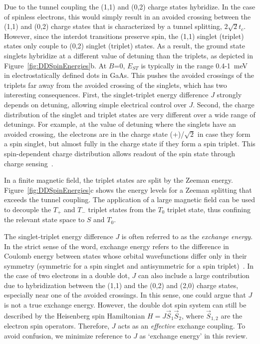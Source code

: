 \documentclass[rmp,twocolumn,aps]{revtex4}
\begin{document}
Due to the tunnel coupling the (1,1) and (0,2) charge states
hybridize. In the case of spinless electrons, this would simply
result in an avoided crossing between the (1,1) and (0,2) charge
states that is characterized by a tunnel splitting, $2\sqrt{2}
t_c$. However, since the interdot transitions preserve spin, the
(1,1) singlet (triplet) states only couple to (0,2)
singlet (triplet) states. As a result, the ground state singlets
hybridize at a different value of detuning than the triplets, as depicted
in Figure~\ref{fig:DDSpinEnergies}b. At $B$=0, $E_{ST}$ is typically in the range 0.4-1~meV in electrostatically defined dots in GaAs.
This pushes the avoided crossings of the triplets far away from
the avoided crossing of the singlets, which has two interesting consequences.
First, the singlet-triplet energy difference $J$ strongly depends on detuning, allowing simple electrical control over $J$.
Second, the charge distribution of the singlet and triplet states are very different over a wide
range of detunings. For example, at the value of detuning where the
singlets have an avoided crossing, the electrons are in the charge state
(+)/$\sqrt{2}$ in case they form a spin
singlet, but almost fully in the charge state  if they
form a spin triplet. This spin-dependent charge distribution
allows readout of the spin state through charge sensing~\cite{TaylerNaturePhysics2005,EngelPRL2004}.

In a finite magnetic field, the triplet states are split by the
Zeeman energy. Figure~\ref{fig:DDSpinEnergies}c shows the energy
levels for a Zeeman splitting that exceeds the tunnel coupling.
The application of a large magnetic field can be used to decouple
the $T_+$ and $T_-$ triplet states from the $T_0$ triplet state,
thus confining the relevant state space to $S$ and $T_0$.

The singlet-triplet energy difference $J$ is often referred to as the \textit{exchange energy}. In the strict sense of the word, exchange energy refers to the difference in Coulomb energy between states whose orbital wavefunctions differ only in their symmetry (symmetric for a spin singlet and antisymmetric for a spin triplet)~\cite{ashcroft}. In the case of two electrons in a double dot, $J$ can also include a large contribution due to hybridization between the (1,1) and the (0,2) and (2,0) charge states, especially near one of the avoided crossings. In this sense, one could argue that $J$ is not a true exchange energy. However, the double dot spin system can still be described by the Heisenberg spin Hamiltonian $H= J \vec{S}_1 \vec{S}_2$, where $\vec{S}_{1,2}$ are the electron spin operators. Therefore, $J$ acts as an \textit{effective} exchange coupling. To avoid confusion, we minimize reference to $J$ as `exchange energy' in this review.
\end{document}
